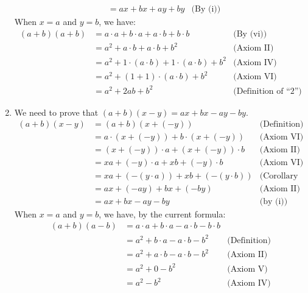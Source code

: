 \documentclass[12pt]{book}
\theoremstyle{definition}
\begin{document}
\begin{sol}
\begin{enumerate}[label=(\roman*)]
\begin{align*}
 			&= ax+bx+ay+by & \text{(By (i))}
 		\end{align*}
 		When $x=a$ and $y=b$, we have:
 		\begin{align*}
 			(a+b)(a+b) &= a\cdot a + b\cdot a + a\cdot b+b\cdot b & \text{(By (vi))}	\\
 			&= a^2+a\cdot b + a\cdot b + b^2 & \text{(Axiom II)}\\
 			&= a^2 + 1\cdot (a\cdot b) + 1\cdot (a\cdot b) + b^2 & \text{(Axiom IV)}\\
 			&= a^2 +(1+1)\cdot (a\cdot b)+b^2 & \text{(Axiom VI)}\\
 			&= a^2 + 2ab +b^2 & \text{(Definition of ``2'')}
 		\end{align*}
	\item We need to prove that $(a+b)(x-y)=ax+bx-ay-by$.
		\begin{align*}
			(a+b)(x-y) &= (a+b)(x+(-y)) & \text{(Definition)}\\
			&= a\cdot (x+(-y))+b\cdot (x+(-y)) & \text{(Axiom VI)}\\
			&= (x+(-y)) \cdot a +(x+(-y)) \cdot b & \text{(Axiom II)}\\
			&= xa + (-y)\cdot a + xb+(-y)\cdot b & \text{(Axiom VI)}\\
			&= xa+ (- (y\cdot a))+xb +(-(y\cdot b)) & \text{(Corollary 6)}\\
			&= ax+(-ay) +bx+(-by) & \text{(Axiom II)} \\
			&= ax+ bx-ay-by & \text{(by (i))}
		\end{align*}
		When $x=a$ and $y=b$, we have, by the current formula:
		\begin{align*}
			(a+b)(a-b) &= a\cdot a+ b\cdot a-a\cdot b-b\cdot b\\
			&= a^2 + b\cdot a-a\cdot b-b^2 & \text{(Definition)}\\
			&= a^2+ a\cdot b - a\cdot b - b^2 & \text{(Axiom II)}\\
			&= a^2 +0-b^2 & \text{(Axiom V)}\\
			&= a^2 -b^2 & \text{(Axiom IV)}
		\end{align*} 
\end{enumerate}	
\end{sol}
\end{document}
